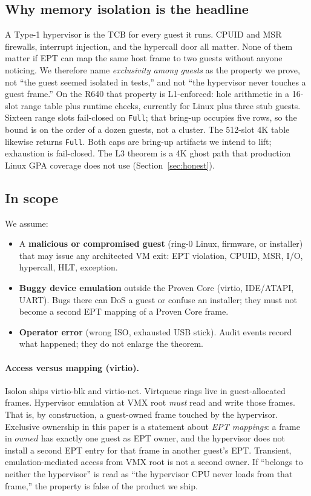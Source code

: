 \documentclass[sigplan,10pt,anonymous]{acmart}
\begin{document}
\subsection{Why memory isolation is the headline}

A Type-1 hypervisor is the TCB for every guest it runs. CPUID and MSR
firewalls, interrupt injection, and the hypercall door all matter. None of
them matter if EPT can map the same host frame to two guests without anyone
noticing. We therefore name \emph{exclusivity among guests} as the property
we prove, not ``the guest seemed isolated in tests,'' and not ``the
hypervisor never touches a guest frame.''
On the R640 that property is L1-enforced: hole arithmetic in a 16-slot
range table plus runtime checks, currently for Linux plus three stub
guests. Sixteen range slots fail-closed on \texttt{Full}; that bring-up
occupies five rows, so the bound is on the order of a dozen guests, not a
cluster. The 512-slot 4K table likewise returns \texttt{Full}. Both caps
are bring-up artifacts we intend to lift; exhaustion is fail-closed.
The L3 theorem is a 4K ghost path that production Linux GPA coverage does
not use (Section~\ref{sec:honest}).

\subsection{In scope}

We assume:

\begin{itemize}
\item A \textbf{malicious or compromised guest} (ring-0 Linux, firmware, or
  installer) that may issue any architected VM exit: EPT violation, CPUID,
  MSR, I/O, hypercall, HLT, exception.
\item \textbf{Buggy device emulation} outside the Proven Core (virtio, IDE/ATAPI,
  UART). Bugs there can DoS a guest or confuse an installer; they must not
  become a second EPT mapping of a Proven Core frame.
\item \textbf{Operator error} (wrong ISO, exhausted USB stick). Audit events
  record what happened; they do not enlarge the theorem.
\end{itemize}

\paragraph{Access versus mapping (virtio).}
Isolon ships virtio-blk and virtio-net. Virtqueue rings live in
guest-allocated frames. Hypervisor emulation at VMX root \emph{must} read
and write those frames. That is, by construction, a guest-owned frame
touched by the hypervisor. Exclusive ownership in this paper is a
statement about \emph{EPT mappings}: a frame in $\mathit{owned}$ has exactly
one guest as EPT owner, and the hypervisor does not install a second EPT
entry for that frame in another guest's EPT. Transient,
emulation-mediated access from VMX root is not a second owner. If
``belongs to neither the hypervisor'' is read as ``the hypervisor CPU never
loads from that frame,'' the property is false of the product we ship.
\end{document}
